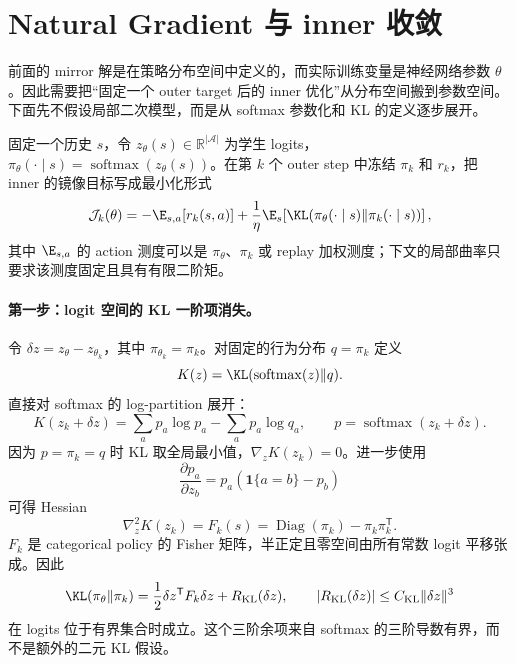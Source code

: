 \section{Natural Gradient 与 inner 收敛}
\label{sec:ch2-natural-gradient}

前面的 mirror 解是在策略分布空间中定义的，而实际训练变量是神经网络参数 $\theta$。因此需要把“固定一个 outer target 后的 inner 优化”从分布空间搬到参数空间。下面先不假设局部二次模型，而是从 softmax 参数化和 KL 的定义逐步展开。

固定一个历史 $s$，令 $z_\theta(s)\in\mathbb R^{|\mathcal A|}$ 为学生 logits，$\pi_\theta(\cdot\mid s)=\operatorname{softmax}(z_\theta(s))$。在第 $k$ 个 outer step 中冻结 $\pi_k$ 和 $r_k$，把 inner 的镜像目标写成最小化形式
\begin{equation}
\label{eq:ch2-opd-inner-objective}
\mathcal J_k(\theta)
=
-\E_{s,a}[r_k(s,a)]
+\frac{1}{\eta}\E_s\!\left[
\KL\!\left(\pi_\theta(\cdot\mid s)\Vert\pi_k(\cdot\mid s)\right)
\right],
\end{equation}
其中 $\E_{s,a}$ 的 action 测度可以是 $\pi_\theta$、$\pi_k$ 或 replay 加权测度；下文的局部曲率只要求该测度固定且具有有限二阶矩。

\paragraph*{第一步：logit 空间的 KL 一阶项消失。}
令 $\delta z=z_\theta-z_{\theta_k}$，其中 $\pi_{\theta_k}=\pi_k$。对固定的行为分布 $q=\pi_k$ 定义
\[
K(z)=\KL(\operatorname{softmax}(z)\Vert q).
\]
直接对 softmax 的 log-partition 展开：
\[
K(z_k+\delta z)
=
\sum_a p_a\log p_a-\sum_a p_a\log q_a,
\qquad p=\operatorname{softmax}(z_k+\delta z).
\]
因为 $p=\pi_k=q$ 时 KL 取全局最小值，$\nabla_zK(z_k)=0$。进一步使用
\[
\frac{\partial p_a}{\partial z_b}
=p_a(\mathbf 1\{a=b\}-p_b)
\]
可得 Hessian
\begin{equation}
\label{eq:ch2-logit-fisher}
\nabla_z^2K(z_k)
=
F_k(s)
=
\operatorname{Diag}(\pi_k)-\pi_k\pi_k^{\mathsf T}.
\end{equation}
$F_k$ 是 categorical policy 的 Fisher 矩阵，半正定且零空间由所有常数 logit 平移张成。因此
\begin{equation}
\label{eq:ch2-kl-logit-expansion}
\KL(\pi_\theta\Vert\pi_k)
=
\frac12\delta z^{\mathsf T}F_k\delta z
+R_{\mathrm{KL}}(\delta z),
\qquad
|R_{\mathrm{KL}}(\delta z)|
\leq C_{\mathrm{KL}}\|\delta z\|^3
\end{equation}
在 logits 位于有界集合时成立。这个三阶余项来自 softmax 的三阶导数有界，而不是额外的二元 KL 假设。

